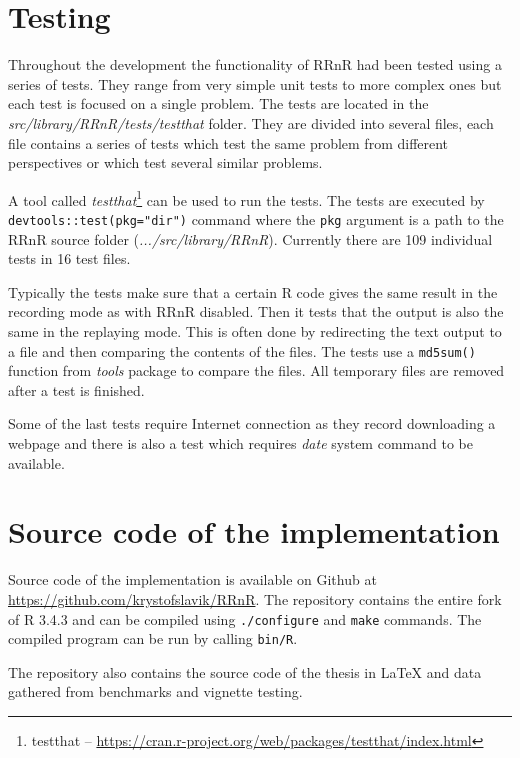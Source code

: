 \documentclass[thesis=M,english,hidelinks]{FITthesis}[2012/10/20]
\begin{document}
	\section{Testing}\label{testing}
	Throughout the development the functionality of RRnR had been tested using a series of tests. They range from very simple unit tests to more complex ones but each test is focused on a single problem. The tests are located in the \emph{src/library/RRnR/tests/testthat} folder. They are divided into several files, each file contains a series of tests which test the same problem from different perspectives or which test several similar problems.\par
	
	A tool called \emph{testthat}\footnote{testthat -- \url{https://cran.r-project.org/web/packages/testthat/index.html}} can be used to run the tests. The tests are executed by \lstinline|devtools::test(pkg="dir")| command where the \lstinline|pkg| argument is a path to the RRnR source folder (\emph{.../src/library/RRnR}). Currently there are 109 individual tests in 16 test files.\par
	
	Typically the tests make sure that a certain R code gives the same result in the recording mode as with RRnR disabled. Then it tests that the output is also the same in the replaying mode. This is often done by redirecting the text output to a file and then comparing the contents of the files. The tests use a \lstinline|md5sum()| function from \emph{tools} package to compare the files. All temporary files are removed after a test is finished.\par
	
	Some of the last tests require Internet connection as they record downloading a webpage and there is also a test which requires \emph{date} system command to be available.\par
	
	\section{Source code of the implementation}
	Source code of the implementation is available on Github at \url{https://github.com/krystofslavik/RRnR}. The repository contains the entire fork of R 3.4.3 and can be compiled using \lstinline|./configure| and \lstinline|make| commands. The compiled program can be run by calling \lstinline|bin/R|.\par
	
	The repository also contains the source code of the thesis in \LaTeX{} and data gathered from benchmarks and vignette testing.\par
\end{document}
